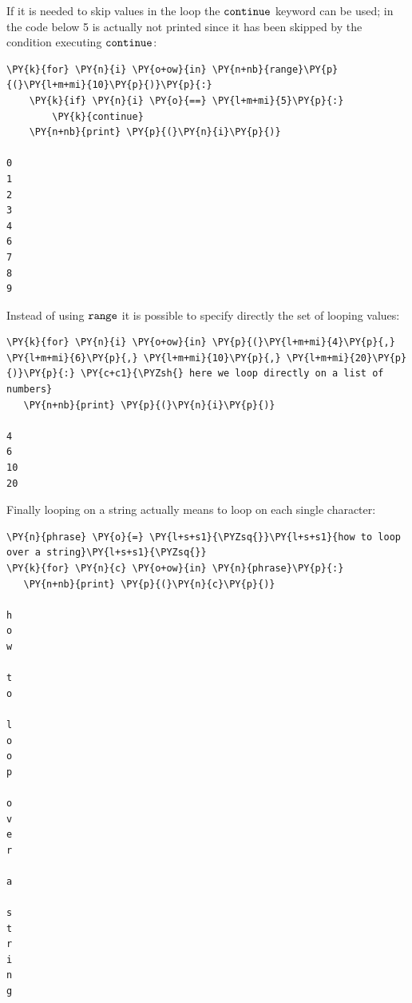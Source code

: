 If it is needed to skip values in the loop the $\tt{continue}$ keyword can be used; 
in the code below 5 is actually not printed since it has been skipped by the condition executing 
$\tt{continue}$:

\begin{codebox}[breakable, size=fbox, boxrule=1pt, pad at break*=1mm, colback=cellbackground, colframe=cellborder]            
\begin{Verbatim}[commandchars=\\\{\}]
\PY{k}{for} \PY{n}{i} \PY{o+ow}{in} \PY{n+nb}{range}\PY{p}{(}\PY{l+m+mi}{10}\PY{p}{)}\PY{p}{:}
    \PY{k}{if} \PY{n}{i} \PY{o}{==} \PY{l+m+mi}{5}\PY{p}{:}
        \PY{k}{continue} 
    \PY{n+nb}{print} \PY{p}{(}\PY{n}{i}\PY{p}{)}

0
1
2
3
4
6
7
8
9
\end{Verbatim}
\end{codebox}

Instead of using $\tt{range}$ it is possible to specify directly the set of looping values:

\begin{codebox}[breakable, size=fbox, boxrule=1pt, pad at break*=1mm, colback=cellbackground, colframe=cellborder]            
\begin{Verbatim}[commandchars=\\\{\}]
\PY{k}{for} \PY{n}{i} \PY{o+ow}{in} \PY{p}{(}\PY{l+m+mi}{4}\PY{p}{,} \PY{l+m+mi}{6}\PY{p}{,} \PY{l+m+mi}{10}\PY{p}{,} \PY{l+m+mi}{20}\PY{p}{)}\PY{p}{:} \PY{c+c1}{\PYZsh{} here we loop directly on a list of numbers}
   \PY{n+nb}{print} \PY{p}{(}\PY{n}{i}\PY{p}{)}

4
6
10
20
\end{Verbatim}
\end{codebox}

Finally looping on a string actually means to loop on each single character:
 
\begin{codebox}[breakable, size=fbox, boxrule=1pt, pad at break*=1mm, colback=cellbackground, colframe=cellborder]            
\begin{Verbatim}[commandchars=\\\{\}]
\PY{n}{phrase} \PY{o}{=} \PY{l+s+s1}{\PYZsq{}}\PY{l+s+s1}{how to loop over a string}\PY{l+s+s1}{\PYZsq{}}
\PY{k}{for} \PY{n}{c} \PY{o+ow}{in} \PY{n}{phrase}\PY{p}{:}
   \PY{n+nb}{print} \PY{p}{(}\PY{n}{c}\PY{p}{)}

h
o
w
 
t
o
 
l
o
o
p
 
o
v
e
r
 
a
 
s
t
r
i
n
g
\end{Verbatim}
\end{codebox}

